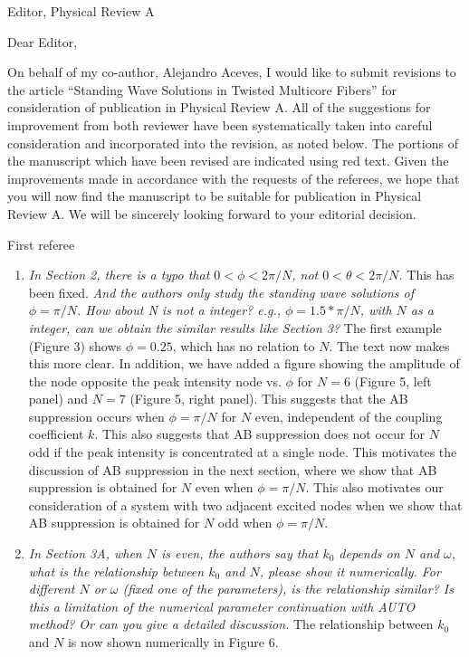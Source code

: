 \documentclass[11pt]{letter}
\begin{document}
\address{Ross Parker \\
Department of Mathematics \\
Southern Methodist University \\
Dallas, TX 75275 \\
\texttt{rhparker@smu.edu}}%
\signature{Ross Parker}
\begin{letter}{Editor, Physical Review A}

\opening{Dear Editor,}

On behalf of my co-author, Alejandro Aceves, I would like to submit revisions to the article ``Standing Wave Solutions in Twisted Multicore Fibers'' for consideration of publication in Physical Review A. All of the suggestions for improvement from both reviewer have been systematically taken into careful consideration and incorporated into the revision, as noted below. The portions of the manuscript which have been revised are indicated using red text. Given the improvements made in accordance with the requests of the referees, we hope that you will now find the manuscript to be suitable for publication in Physical Review A. We will be sincerely looking forward to your editorial decision.

First referee
\begin{enumerate}
\item \emph{In Section 2, there is a typo that $0<\phi<2\pi/N$, not $0<\theta<2\pi/N$.} This has been fixed. \emph{And the authors only study the standing wave solutions of $\phi=\pi/N$. How about N is not a integer? e.g., $\phi=1.5*\pi/N$, with $N$ as a integer, can we obtain the similar results like Section 3?} The first example (Figure 3) shows $\phi = 0.25$, which has no relation to $N$. The text now makes this more clear. In addition, we have added a figure showing the amplitude of the node opposite the peak intensity node vs. $\phi$ for $N=6$ (Figure 5, left panel) and $N=7$ (Figure 5, right panel). This suggests that the AB suppression occurs when $\phi = \pi/N$ for $N$ even, independent of the coupling coefficient $k$. This also suggests that AB suppression does not occur for $N$ odd if the peak intensity is concentrated at a single node. This motivates the discussion of AB suppression in the next section, where we show that AB suppression is obtained for $N$ even when $\phi = \pi/N$. This also motivates our consideration of a system with two adjacent excited nodes when we show that AB suppression is obtained for $N$ odd when $\phi = \pi/N$.

\item \emph{In Section 3A, when $N$ is even, the authors say that $k_0$ depends on $N$ and $\omega$, what is the relationship between $k_0$ and $N$, please show it numerically. For different $N$ or $\omega$ (fixed one of the parameters), is the relationship similar? Is this a limitation of the numerical parameter continuation with AUTO method? Or can you give a detailed discussion.} The relationship between $k_0$ and $N$ is now shown numerically in Figure 6.


\end{enumerate}
\end{letter}
\end{document}
